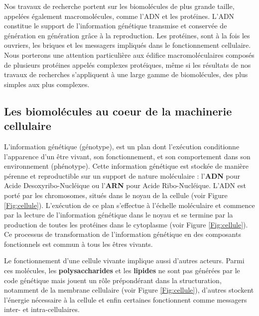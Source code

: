 Nos travaux de recherche portent sur les biomolécules de plus grande taille, appelées également macromolécules, comme l'ADN et les protéines. L'ADN constitue le support de l'information génétique transmise et conservée de génération en génération grâce à la reproduction. Les protéines, sont à la fois les ouvriers, les briques et les messagers impliqués dans le fonctionnement cellulaire. Nous porterons une attention particulière aux édifice macromoléculaires composés de plusieurs protéines appelés complexes protéiques, même si les résultats de nos travaux de recherches s'appliquent à une large gamme de biomolécules, des plus simples aux plus complexes.

\subsection{Les biomolécules au coeur de la machinerie cellulaire}

L'information génétique (génotype), est un plan dont l'exécution conditionne l'apparence d'un être vivant, son fonctionnement, et son comportement dans son environnement (phénotype). Cette information génétique est stockée de manière pérenne et reproductible sur un support de nature moléculaire : l'\textbf{ADN} pour Acide Desoxyribo-Nucléique ou l'\textbf{ARN} pour Acide Ribo-Nucléique. L'ADN est porté par les chromosomes, situés dans le noyau de la cellule (voir Figure \ref{Fig:cellule}).
L'exécution de ce plan s'effectue à l'échelle moléculaire et commence par la lecture de l'information génétique dans le noyau et se termine par la production de toutes les protéines dans le cytoplasme (voir Figure \ref{Fig:cellule}). Ce processus de transformation de l'information génétique en des composants fonctionnels est commun à tous les êtres vivants.

Le fonctionnement d'une cellule vivante implique aussi d'autres acteurs. Parmi ces molécules, les \textbf{polysaccharides} et les \textbf{lipides} ne sont pas générées par le code génétique mais jouent un rôle prépondérant dans la structuration, notamment de la membrane cellulaire (voir Figure \ref{Fig:cellule}), d'autres stockent l'énergie nécessaire à la cellule et enfin certaines fonctionnent comme messagers inter- et intra-cellulaires.


